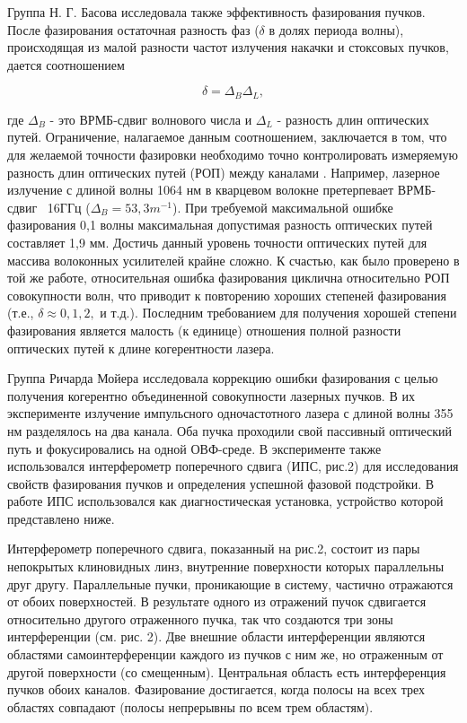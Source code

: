 Группа Н. Г. Басова исследовала также эффективность фазирования
пучков. После фазирования остаточная разность фаз ($\delta$ в долях
периода волны), происходящая из малой разности частот излучения
накачки и стоксовых пучков, дается соотношением

\begin{equation}\label{delta}
   \delta = \Delta_B \Delta_L,
\end{equation}

где $\Delta_B$ - это ВРМБ-сдвиг волнового числа и $\Delta_L$ -
разность длин оптических путей. Ограничение, налагаемое данным
соотношением, заключается в том, что для желаемой точности фазировки
необходимо точно контролировать измеряемую разность длин оптических
путей (РОП) между каналами \cite{124,127}. Например, лазерное
излучение с длиной волны 1064 нм в кварцевом волокне претерпевает
ВРМБ-сдвиг ~16ГГц ($\Delta_B = 53,3  m^{-1}$). При требуемой
максимальной ошибке фазирования 0,1 волны максимальная допустимая
разность оптических путей составляет 1,9 мм. Достичь данный уровень
точности оптических путей для массива волоконных усилителей крайне
сложно. К счастью, как было проверено в той же работе, относительная
ошибка фазирования циклична относительно РОП совокупности волн, что
приводит к повторению хороших степеней фазирования (т.е., $\delta
\approx 0, 1, 2,$ и т.д.). Последним требованием для получения
хорошей степени фазирования является малость (к единице) отношения
полной разности оптических путей к длине когерентности лазера.


Группа Ричарда Мойера исследовала коррекцию ошибки фазирования с
целью получения когерентно объединенной совокупности лазерных
пучков. В их эксперименте излучение импульсного одночастотного
лазера с длиной волны 355 нм разделялось на два канала. Оба пучка
проходили свой пассивный оптический путь и фокусировались на одной
ОВФ-среде. В эксперименте также использовался интерферометр
поперечного сдвига (ИПС, рис.2) для исследования свойств фазирования
пучков и определения успешной фазовой подстройки. В работе ИПС
использовался как диагностическая установка, устройство которой
представлено ниже.


Интерферометр поперечного сдвига, показанный на рис.2, состоит из
пары непокрытых клиновидных линз, внутренние поверхности которых
параллельны друг другу. Параллельные пучки, проникающие в систему,
частично отражаются от обоих поверхностей. В результате одного из
отражений пучок сдвигается относительно другого отраженного пучка,
так что создаются три зоны интерференции (см. рис. 2). Две внешние
области интерференции являются областями самоинтерференции каждого
из пучков с ним же, но отраженным от другой поверхности (со
смещенным). Центральная область есть интерференция пучков обоих
каналов. Фазирование достигается, когда полосы на всех трех областях
совпадают (полосы непрерывны по всем трем областям).


